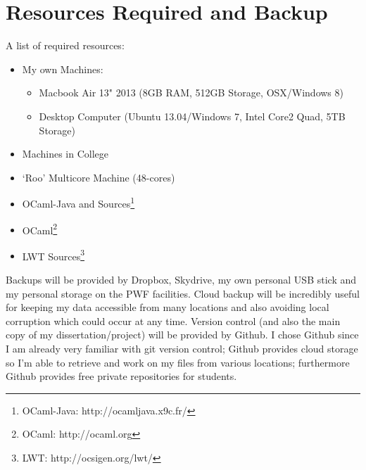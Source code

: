 \documentclass[a4paper]{article}
\begin{document}
\section{Resources Required and Backup}
\label{sec:resources}
A list of required resources:
\begin{itemize}
\item{My own Machines:
    \begin{itemize}
    \item{Macbook Air 13" 2013 (8GB RAM, 512GB Storage, OSX/Windows 8)}
    \item{Desktop Computer (Ubuntu 13.04/Windows 7, Intel Core2 Quad, 5TB Storage)}
    \end{itemize}
}
\item{Machines in College}
\item{`Roo' Multicore Machine (48-cores)}
\item{OCaml-Java and Sources\footnote{OCaml-Java: http://ocamljava.x9c.fr/}}
\item{OCaml\footnote{OCaml: http://ocaml.org}}
\item{LWT Sources\footnote{LWT: http://ocsigen.org/lwt/}}
\end{itemize}

Backups will be provided by Dropbox, Skydrive, my own personal USB stick and my personal storage on the PWF facilities. Cloud backup will be incredibly useful for keeping my data accessible from many locations and also avoiding local corruption which could occur at any time.
Version control (and also the main copy of my dissertation/project) will be provided by Github. I chose Github since I am already very familiar with git version control; Github provides cloud storage so I'm able to retrieve and work on my files from various locations; furthermore Github provides free private repositories for students.



\end{document}
